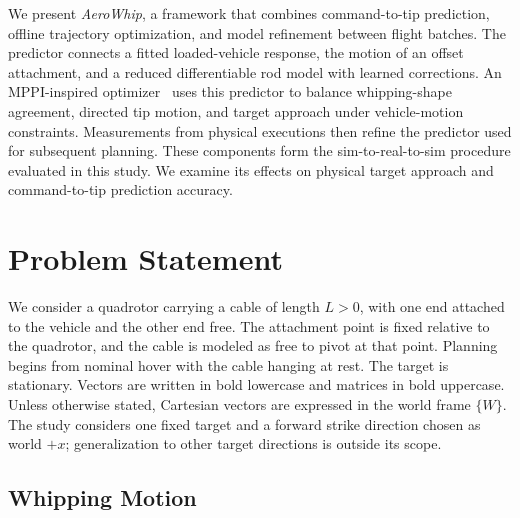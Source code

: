 \documentclass[letterpaper, 10 pt, conference]{ieeeconf}
\newcommand{\Tony}[1]{{\color{orange}#1}}
\begin{document}
We present \emph{AeroWhip}, a framework that combines command-to-tip
prediction, offline trajectory optimization, and model refinement
between flight batches. The predictor connects a fitted loaded-vehicle
response, the motion of an offset attachment, and a reduced
differentiable rod model with learned corrections. An MPPI-inspired
optimizer~\cite{williams2017model} uses this predictor to balance
whipping-shape agreement, directed tip motion, and target approach
under vehicle-motion constraints. Measurements from physical
executions then refine the predictor used for subsequent planning.
These components form the sim-to-real-to-sim procedure evaluated
in this study. We examine its effects on physical target approach
and command-to-tip prediction accuracy.

\section{Problem Statement}
\label{sec:problem_statement}

We consider a quadrotor carrying a cable of length $L>0$, with
one end attached to the vehicle and the other end free. The
attachment point is fixed relative to the quadrotor, and the cable
is modeled as free to pivot at that point. Planning begins from
nominal hover with the cable hanging at rest. The target is
stationary. Vectors are written in bold lowercase and matrices in
bold uppercase. Unless otherwise stated, Cartesian vectors are expressed
in the world frame $\{W\}$. The study considers one fixed target
and a forward strike direction chosen as world $+x$; generalization
to other target directions is outside its scope.

\subsection{Whipping Motion}
\label{subsec:whipping_motion}

\end{document}
